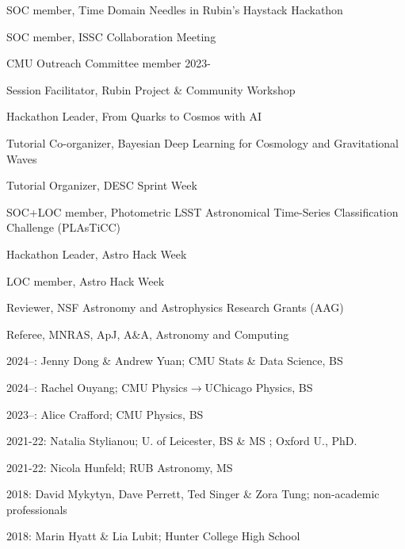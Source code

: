 \documentclass[11pt,letterpaper]{article}
\begin{document}
\nopagebreak\begin{list}{}{\malzlist}
	\item SOC member, Time Domain Needles in Rubin’s Haystack Hackathon 
	\item SOC member, ISSC Collaboration Meeting 
	\item CMU Outreach Committee member 2023-
	\item Session Facilitator, Rubin Project \& Community Workshop 
	\item Hackathon Leader, From Quarks to Cosmos with AI 
	\item Tutorial Co-organizer, Bayesian Deep Learning for Cosmology and Gravitational Waves 
	\item Tutorial Organizer, DESC Sprint Week 
	\item SOC+LOC member, Photometric LSST Astronomical Time-Series Classification Challenge (PLAsTiCC) 
	\item Hackathon Leader, Astro Hack Week 
	\item LOC member, Astro Hack Week 
	\item Reviewer, NSF Astronomy and Astrophysics Research Grants (AAG) 
	\item Referee, MNRAS, ApJ, A\&A, Astronomy and Computing 
\end{list}

\begin{list}{}{\malzlist}
	\item 2024--: Jenny Dong \& Andrew Yuan; CMU Stats \& Data Science, BS 
	\item 2024--: Rachel Ouyang; CMU Physics$\rightarrow$UChicago Physics, BS 
	\item 2023--: Alice Crafford; CMU Physics, BS 
	\item 2021-22: Natalia Stylianou; U. of Leicester, BS \& MS ; Oxford U., PhD. 
	\item 2021-22: Nicola Hunfeld; RUB Astronomy, MS 
	\item 2018: David Mykytyn, Dave Perrett, Ted Singer \& Zora Tung; non-academic professionals
	\item 2018: Marin Hyatt \& Lia Lubit; Hunter College High School 
\end{list}
\end{document}
